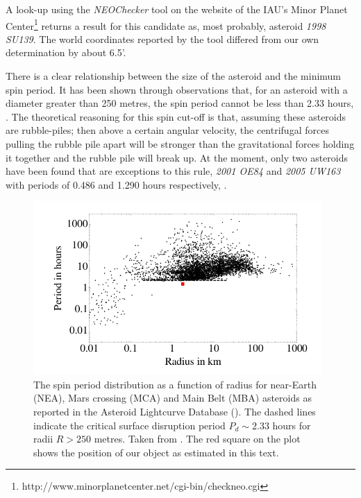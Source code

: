 A look-up using the \emph{NEOChecker} tool on the website of the IAU's Minor Planet Center\footnote{http://www.minorplanetcenter.net/cgi-bin/checkneo.cgi} returns a result for this candidate as, most probably, asteroid \emph{1998 SU139}. The world coordinates reported by the tool differed from our own determination by about 6.5'. 

There is a clear relationship between the size of the asteroid and the minimum spin period. It has been shown through observations that, for an asteroid with a diameter greater than 250 metres, the spin period cannot be less than 2.33 hours, \citep{Jacobson2014}. The theoretical reasoning for this spin cut-off is that, assuming these asteroids are rubble-piles; then above a certain angular velocity, the centrifugal forces pulling the rubble pile apart will be stronger than the gravitational forces holding it together and the rubble pile will break up. At the moment, only two asteroids have been found that are exceptions to this rule, \emph{2001 OE84} and \emph{2005 UW163} with periods of 0.486 and 1.290 hours respectively, \citep{Chang2014}. 

  \begin{figure}
    \center
    \includegraphics[width=110mm]{images/jacobson-asteroid-rotation-dot.png} 
    \caption{The spin period distribution as a function of radius for near-Earth (NEA), Mars crossing (MCA) and Main Belt (MBA) asteroids as reported in the Asteroid Lightcurve Database (\cite{2009Icar..202..134W}). The dashed lines indicate the critical surface disruption period $P_d \sim 2.33$ hours for radii $R > 250$ metres. Taken from \cite{Jacobson2014}. The red square on the plot shows the position of our object as estimated in this text.}
    \label{fig:spinrotationcutoff}
  \end{figure}
  

